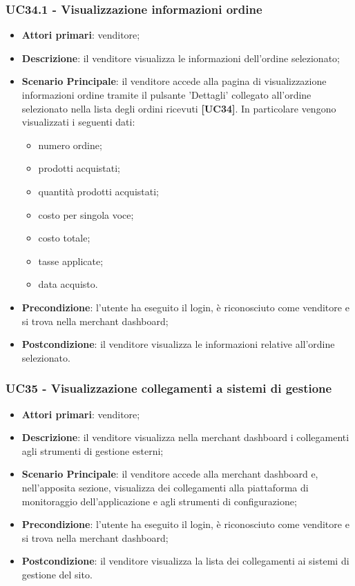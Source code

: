 \subsubsection{UC34.1 - Visualizzazione informazioni ordine}
\begin{itemize}
\item \textbf{Attori primari}: venditore;
\item \textbf{Descrizione}: il venditore visualizza le informazioni dell'ordine selezionato;
\item \textbf{Scenario Principale}: il venditore accede alla pagina di visualizzazione informazioni ordine tramite il pulsante 'Dettagli' collegato all'ordine selezionato nella lista degli ordini ricevuti \textbf{[UC34]}. In particolare vengono visualizzati i seguenti dati:
\begin{itemize}
	\item numero ordine;
	\item prodotti acquistati;
	\item quantità prodotti acquistati;
	\item costo per singola voce;
	\item costo totale;
	\item tasse applicate;
	\item data acquisto.
\end{itemize}
\item \textbf{Precondizione}: l'utente ha eseguito il login, è riconosciuto come venditore e si trova nella merchant dashboard;
\item \textbf{Postcondizione}: il venditore visualizza le informazioni relative all'ordine selezionato.
\end{itemize}

\subsubsection{UC35 - Visualizzazione collegamenti a sistemi di gestione}
\begin{itemize}
\item \textbf{Attori primari}: venditore;
\item \textbf{Descrizione}: il venditore visualizza nella merchant dashboard i collegamenti agli strumenti di gestione esterni;
\item \textbf{Scenario Principale}: il venditore accede alla merchant dashboard e, nell'apposita sezione, visualizza dei collegamenti alla piattaforma di monitoraggio dell'applicazione e agli strumenti di configurazione;
\item \textbf{Precondizione}: l'utente ha eseguito il login, è riconosciuto come venditore e si trova nella merchant dashboard;
\item \textbf{Postcondizione}: il venditore visualizza la lista dei collegamenti ai sistemi di gestione del sito.
\end{itemize}